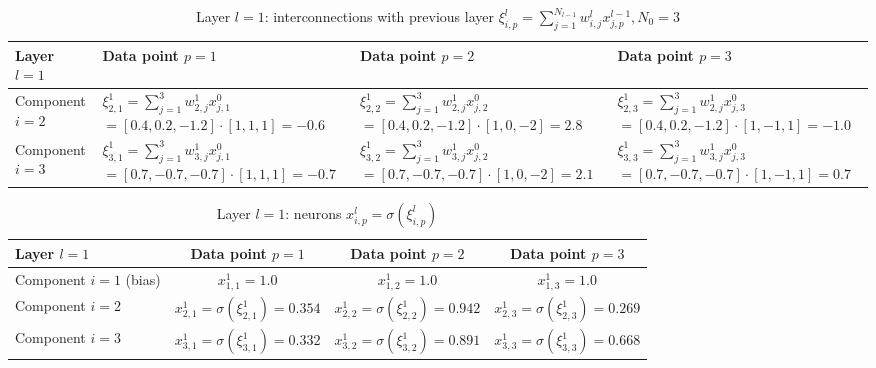 \begin{table}[h!]
    \centering
    \begin{tabular}{|m{2.5cm}|p{3.5cm}|p{3.5cm}|p{3.5cm}|}
        \hline
        \centering Layer $l = 1$ & Data point $p = 1$ & Data point $p = 2$ & Data point $p = 3$ \\
        \hline
        \centering Component $i = 2$ &
        $\xi_{2, 1}^1 = \sum_{j=1}^3{w_{2, j}^1 x_{j, 1}^0}$
        $= [0.4, 0.2, -1.2] \cdot [1, 1, 1] = -0.6$ &

        $\xi_{2, 2}^1 = \sum_{j=1}^3{w_{2, j}^1 x_{j, 2}^0}$
        $= [0.4, 0.2, -1.2] \cdot [1, 0, -2] = 2.8$ &

        $\xi_{2, 3}^1 = \sum_{j=1}^3{w_{2, j}^1 x_{j, 3}^0}$
        $= [0.4, 0.2, -1.2] \cdot [1, -1, 1] = -1.0$ \\
        \hline
        \centering Component $i = 3$ &
        $\xi_{3, 1}^1 = \sum_{j=1}^3{w_{3, j}^1 x_{j, 1}^0}$
        $= [0.7, -0.7, -0.7] \cdot [1, 1, 1] = -0.7$ &

        $\xi_{3, 2}^1 = \sum_{j=1}^3{w_{3, j}^1 x_{j, 2}^0}$
        $= [0.7, -0.7, -0.7] \cdot [1, 0, -2] = 2.1$ &

        $\xi_{3, 3}^1 = \sum_{j=1}^3{w_{3, j}^1 x_{j, 3}^0}$
        $= [0.7, -0.7, -0.7] \cdot [1, -1, 1] = 0.7$ \\
        \hline
    \end{tabular}
\caption{Layer $l = 1$: interconnections with previous layer $\xi_{i, p} ^{l} = \sum_{j=1}^{N_{l-1}}{w_{i, j}^l x_{j, p}^{l-1}}, N_0 = 3$}
\label{table:layer1-interconnection}
\end{table}

\begin{table}[h!]
    \centering
    \begin{tabular}{|m{2.25cm}|c|c|c|}
        \hline
        Layer $l = 1$ &
        Data point $p = 1$ &
        Data point $p = 2$ &
        Data point $p = 3$ \\
        \hline
        \centering Component $i = 1$ (bias) &
        $x_{1, 1}^1 = 1.0$ &
        $x_{1, 2}^1 = 1.0$ &
        $x_{1, 3}^1 = 1.0$ \\
        \hline
        \centering Component $i = 2$ &
        $x_{2, 1}^1 = \sigma(\xi_{2, 1}^1) = 0.354$ &
        $x_{2, 2}^1 = \sigma(\xi_{2, 2}^1) = 0.942$ &
        $x_{2, 3}^1 = \sigma(\xi_{2, 3}^1) = 0.269$ \\
        \hline
        \centering Component $i = 3$ &
        $x_{3, 1}^1 = \sigma(\xi_{3, 1}^1) = 0.332$ &
        $x_{3, 2}^1 = \sigma(\xi_{3, 2}^1) = 0.891$ &
        $x_{3, 3}^1 = \sigma(\xi_{3, 3}^1) = 0.668$ \\
        \hline
    \end{tabular}
\caption{Layer $l = 1$: neurons $x_{i, p}^l = \sigma(\xi_{i, p}^l)$}
\label{table:layer1-neurons}
\end{table}

